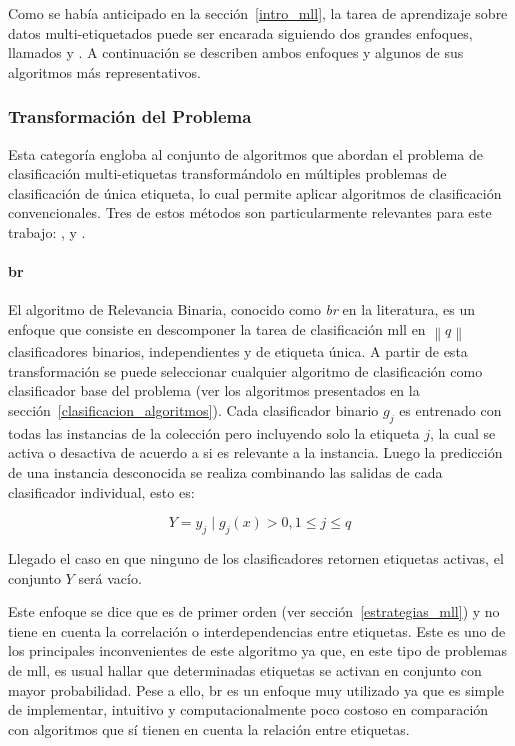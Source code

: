 Como se había anticipado en la sección~\ref{intro_mll}, la tarea de aprendizaje
sobre datos multi-etiquetados puede ser encarada siguiendo dos grandes enfoques,
llamados  y . A continuación se describen ambos enfoques y algunos de sus
algoritmos más representativos.

\subsubsection{Transformación del Problema}

Esta categoría engloba al conjunto de algoritmos que abordan el problema de
clasificación multi-etiquetas transformándolo en múltiples problemas de
clasificación de única etiqueta, lo cual permite aplicar algoritmos de
clasificación convencionales. Tres de estos métodos son particularmente
relevantes para este trabajo: ,  y
.

\paragraph{\acrfull{br}}

El algoritmo de Relevancia Binaria, conocido como \textit{\acrlong{br}} en la
literatura, es un enfoque que consiste en descomponer la tarea de clasificación
\acrshort{mll} en $\left\|q\right\|$ clasificadores binarios, independientes y
de etiqueta única.  A partir de esta transformación se puede seleccionar
cualquier algoritmo de clasificación como clasificador base del problema (ver
los algoritmos presentados en la sección~\ref{clasificacion_algoritmos}).  Cada
clasificador binario $g_{j}$ es entrenado con todas las instancias de la
colección pero incluyendo solo la etiqueta $j$, la cual se activa o desactiva de
acuerdo a si es relevante a la instancia. Luego la predicción de una instancia
desconocida se realiza combinando las salidas de cada clasificador individual,
esto es:

\begin{equation}
	Y = {y_{j} \mid g_{j}(x) > 0, 1 \leq j \leq q}
\end{equation}

Llegado el caso en que ninguno de los clasificadores retornen etiquetas activas,
el conjunto $Y$ será vacío.

Este enfoque se dice que es de primer orden (ver sección~\ref{estrategias_mll})
y no tiene en cuenta la correlación o interdependencias entre etiquetas. Este es
uno de los principales inconvenientes de este algoritmo ya que, en este tipo de
problemas de \acrshort{mll}, es usual hallar que determinadas etiquetas se
activan en conjunto con mayor probabilidad. Pese a ello, \acrshort{br} es un
enfoque muy utilizado \cite{zhang_review_2014} ya que es simple de implementar,
intuitivo y computacionalmente poco costoso en comparación con algoritmos que sí
tienen en cuenta la relación entre etiquetas.

